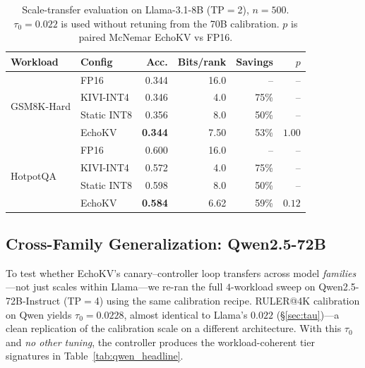 \documentclass{article}
\begin{document}
\begin{table}[h]
\centering
\caption{Scale-transfer evaluation on Llama-3.1-8B (TP$=$2), $n{=}500$.
  $\tau_0{=}0.022$ is used without retuning from the 70B calibration.
  $p$ is paired McNemar EchoKV vs FP16.}
\label{tab:scale_transfer}
\small
\begin{tabular}{llrrrr}
\toprule
Workload & Config & Acc. & Bits/rank & Savings & $p$ \\
\midrule
\multirow{4}{*}{GSM8K-Hard}
 & FP16        & 0.344 & 16.0 & --   & -- \\
 & KIVI-INT4   & 0.346 & 4.0  & 75\% & -- \\
 & Static INT8 & 0.356 & 8.0  & 50\% & -- \\
 & EchoKV      & \textbf{0.344} & 7.50 & 53\% & $1.00$ \\
\midrule
\multirow{4}{*}{HotpotQA}
 & FP16        & 0.600 & 16.0 & --   & -- \\
 & KIVI-INT4   & 0.572 & 4.0  & 75\% & -- \\
 & Static INT8 & 0.598 & 8.0  & 50\% & -- \\
 & EchoKV      & \textbf{0.584} & 6.62 & 59\% & $0.12$ \\
\bottomrule
\end{tabular}
\end{table}

\subsection{Cross-Family Generalization: Qwen2.5-72B}
\label{sec:cross_family}

To test whether EchoKV's canary--controller loop transfers across model
\emph{families}---not just scales within Llama---we re-ran the full
$4$-workload sweep on Qwen2.5-72B-Instruct (TP$=$4) using the same
calibration recipe. RULER@4K calibration on Qwen yields
$\tau_0{=}0.0228$, almost identical to Llama's $0.022$
(\S\ref{sec:tau})---a clean replication of the calibration scale on a
different architecture. With this $\tau_0$ and \emph{no other tuning},
the controller produces the workload-coherent tier signatures in
Table~\ref{tab:qwen_headline}.
\end{document}
